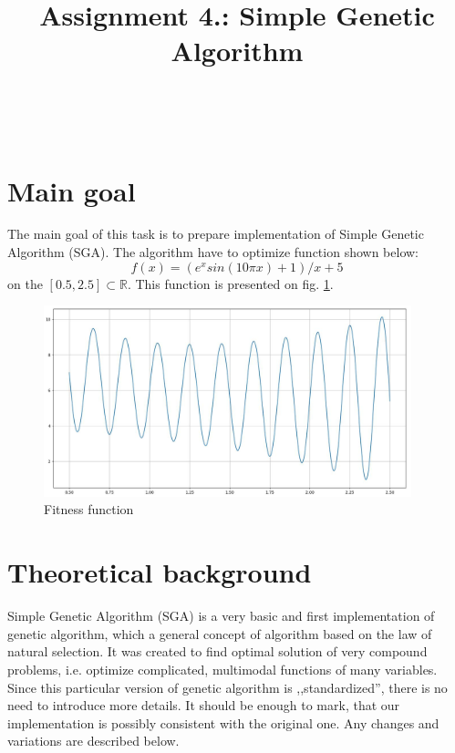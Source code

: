 \documentclass{classrep}
\author{%
    \studentinfo[239671@edu.p.lodz.pl]{Jan Karwowski}{239671}\\
    \studentinfo[239676@edu.p.lodz.pl]{Kamil Kowalewski}{239676}\\
}
\title{Assignment 4.: Simple Genetic Algorithm}
\begin{document}
    \maketitle
    \thispagestyle{fancyplain}

    \tableofcontents
    \newpage

    \section{Main goal} \label{main_goal} {
        The main goal of this task is to prepare implementation of Simple Genetic
        Algorithm (SGA). The algorithm have to optimize function shown below:
        \begin{equation}
            f(x)=(e^x sin(10 \pi x)+1)/x+5
        \end{equation}
        on the $[0.5, 2.5] \subset \mathbb{R}$. This function is presented on fig.
        \ref{fig:fitness_function}.

        \begin{figure}[!htbp]
            \centering
            \includegraphics[width=0.95\textwidth]{img/fitness_function.jpg}
            \caption{Fitness function}
            \label{fig:fitness_function}
        \end{figure}
        \FloatBarrier
    }

    \section{Theoretical background} \label{theory} {
        Simple Genetic Algorithm (SGA) is a very basic and first implementation of genetic
        algorithm, which a general concept of algorithm based on the law of natural selection. It
        was created to find optimal solution of very compound problems, i.e. optimize complicated,
        multimodal functions of many variables. Since this particular version of genetic algorithm
        is ,,standardized'', there is no need to introduce more details. It should be enough to
        mark, that our implementation is possibly consistent with the original one. Any
        changes and variations are described below.
    }
\end{document}
